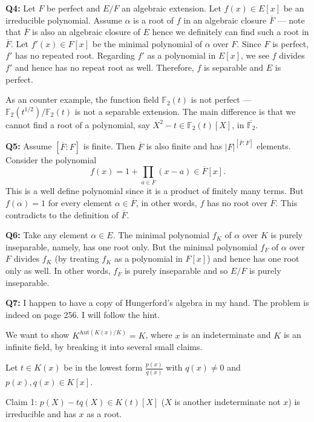 \documentclass[12pt,a4paper]{article}
\def\FF{\mathbb{F}}
\def\Aut{\text{Aut}}
\def\aa{\alpha}
\begin{document}
\bigskip

\noindent\textbf{Q4:}
Let $F$ be perfect and $E/F$ an algebraic extension. Let $f(x) \in E[x]$ be an irreducible polynomial. Assume $\aa$ is a root of $f$ in an algebraic closure $\overline{F}$ ---  note that $\overline{F}$ is also an algebraic closure of $E$ hence we definitely can find such a root in $\overline{F}$. Let $f'(x)\in F[x]$ be the minimal polynomial of $\aa$ over $F$. Since $F$ is perfect, $f'$ has no repeated root. Regarding $f'$ as a polynomial in $E[x]$, we see $f$ divides $f'$ and hence has no repeat root as well. Therefore, $f$ is separable and $E$ is perfect.


As an counter example, the function field $\FF_2(t)$ is not perfect --- $\FF_2(t^{1/2})/\FF_2(t)$ is not a separable extension. The main difference is that we cannot find a root of a polynomial, say $X^2-t \in \FF_2(t)[X]$, in $\overline{\FF_2}$.

\bigskip

\noindent\textbf{Q5:} Assume $[\overline{F}:F]$ is finite. Then $\overline{F}$ is also finite and has $|F|^{[\overline{F}:F]}$ elements. Consider the polynomial $$f(x)=1+\prod_{a\in\overline{F}} (x-a) \in \overline{F}[x].$$ This is a well define polynomial since it is a product of finitely many terms. But $f(\aa)=1$ for every element $\aa\in \overline{F}$, in other words, $f$ has no root over $\overline{F}$. This contradicts to the definition of $\overline{F}$.


\bigskip

\noindent\textbf{Q6:}
Take any element $\aa\in E$. The minimal polynomial $f_K$ of $\aa$ over $K$ is purely inseparable, namely, has one root only. But the minimal polynomial $f_F$ of $\aa$ over $F$ divides $f_K$ (by treating $f_K$ as a polynomial in $F[x]$) and hence has one root only as well. In other words, $f_F$ is purely inseparable and so $E/F$ is purely inseparable.

\bigskip

\noindent\textbf{Q7:} I happen to have a copy of Hungerford's algebra in my hand. The problem is indeed on page 256. I will follow the hint.

We want to show $K^{\Aut(K(x)/K)}=K$, where $x$ is an indeterminate and $K$ is an infinite field, by breaking it into several small claims.

Let $t\in K(x)$ be in the lowest form $\frac{p(x)}{q(x)}$ with $q(x)\not=0$ and $p(x),q(x)\in K[x]$.

Claim 1: $p(X)-tq(X)\in K(t)[X]$ ($X$ is another indeterminate not $x$) is irreducible and has $x$ as a root.
\end{document}

